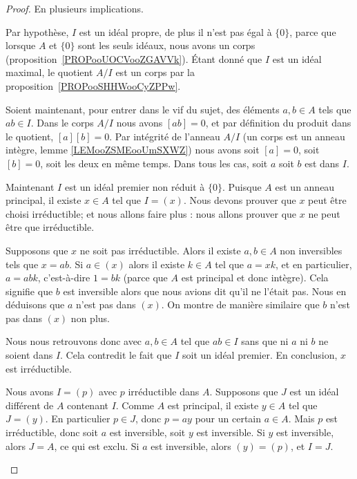 \begin{proof}
	En plusieurs implications.
	\begin{subproof}
		Par hypothèse, \( I\) est un idéal propre, de plus il n'est pas égal à \( \{ 0 \}\), parce que lorsque \( A\) et \( \{ 0 \} \) sont les seuls idéaux, nous avons un corps (proposition~\ref{PROPooUOCVooZGAVVk}). Étant donné que \( I\) est un idéal maximal, le quotient \( A/I\) est un corps par la proposition~\ref{PROPooSHHWooCyZPPw}.

		Soient maintenant, pour entrer dans le vif du sujet, des éléments \( a,b\in A\) tels que \( ab\in I\). Dans le corps \( A/I\) nous avons \( [ab]=0\), et par définition du produit dans le quotient, \( [a][b]=0\). Par intégrité de l'anneau \( A/I\) (un corps est un anneau intègre, lemme \ref{LEMooZSMEooUmSXWZ}) nous avons soit \( [a]=0\), soit \( [b]=0\), soit les deux en même temps. Dans tous les cas, soit \( a\) soit \( b\) est dans \( I\).

		Maintenant \( I\) est un idéal premier non réduit à \( \{ 0 \}\). Puisque \( A\) est un anneau principal, il existe \( x\in A\) tel que \( I=(x)\). Nous devons prouver que \( x\) peut être choisi irréductible; et nous allons faire plus : nous allons prouver que \( x\) ne peut être que irréductible.

		Supposons que \( x\) ne soit pas irréductible. Alors il existe \( a,b\in A\) non inversibles tels que \( x=ab\). Si \( a\in (x)\) alors il existe \( k\in A\) tel que \( a=xk\), et en particulier, \( a=abk\), c'est-à-dire \( 1=bk\) (parce que \( A\) est principal et donc intègre). Cela signifie que \( b\) est inversible alors que nous avions dit qu'il ne l'était pas. Nous en déduisons que \( a\) n'est pas dans \( (x)\). On montre de manière similaire que \( b\) n'est pas dans \( (x)\) non plus.

		Nous nous retrouvons donc avec \( a,b\in A\) tel que \( ab\in I\) sans que ni \( a\) ni \( b\) ne soient dans \( I\). Cela contredit le fait que \( I\) soit un idéal premier. En conclusion, \( x\) est irréductible.

		Nous avons \( I=(p)\) avec \( p\) irréductible dans \( A\). Supposons que \( J\) est un idéal différent de \( A\) contenant \( I\). Comme \( A\) est principal, il existe \( y\in A\) tel que \( J=(y)\). En particulier \( p\in J\), donc \( p=ay\) pour un certain \( a\in A\). Mais \( p\) est irréductible, donc soit \( a\) est inversible, soit \( y\) est inversible. Si \( y\) est inversible, alors \( J=A\), ce qui est exclu. Si \( a\) est inversible, alors \( (y)=(p)\), et \( I=J\).
	\end{subproof}
\end{proof}

